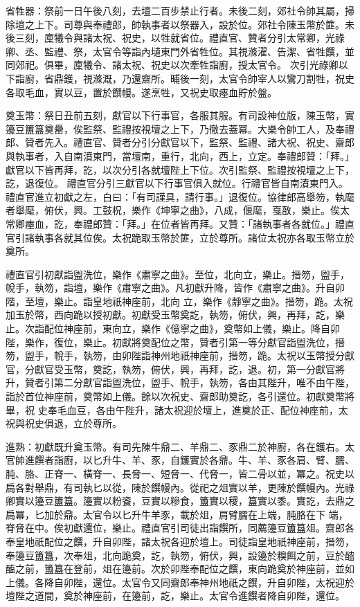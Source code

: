 \begin{pinyinscope}
 省牲器：祭前一日午後八刻，去壇二百步禁止行者。未後二刻，郊社令帥其屬，掃除壇之上下。司尊與奉禮郎，帥執事者以祭器入，設於位。郊社令陳玉幣於篚。未後三刻，廩犧令與諸太祝、祝史，以牲就省位。禮直官、贊者分引太常卿，光祿卿、丞、監禮、祭，太官令等詣內壝東門外省牲位。其視滌濯、告潔、省牲饌，並同郊祀。俱畢，廩犧令、諸太祝、祝史以次牽牲詣廚，授太官令。
 次引光祿卿以下詣廚，省鼎鑊，視滌溉，乃還齋所。晡後一刻，太官令帥宰人以鸞刀割牲，祝史各取毛血，實以豆，置於饌幔。遂烹牲，又祝史取瘞血貯於盤。



 奠玉幣：祭日丑前五刻，獻官以下行事官，各服其服。有司設神位版，陳玉幣，實籩豆簠簋奠罍，俟監祭、監禮按視壇之上下，乃徹去蓋冪。大樂令帥工人，及奉禮郎、贊者先入。禮直官、贊者分引分獻官以下，監祭、監禮、諸大祝、祝史、齋郎與執事者，入自南濆東門，當壇南，重行，北向，西上，立定。奉禮郎贊：「拜。」獻官以下皆再拜，訖，以次分引各就壇陛上下位。次引監祭、監禮按視壇之上下，訖，退復位。
 禮直官分引三獻官以下行事官俱入就位。行禮官皆自南濆東門入。禮直官進立初獻之左，白曰：「有司謹具，請行事。」退復位。協律郎高舉笏，執麾者舉麾，俯伏，興。工鼓柷，樂作《坤寧之曲》，八成，偃麾，戛敔，樂止。俟太常卿瘞血，訖，奉禮郎贊：「拜。」在位者皆再拜。又贊：「諸執事者各就位。」禮直官引諸執事各就其位俟。太祝跪取玉幣於篚，立於尊所。諸位太祝亦各取玉幣立於奠所。



 禮直官引初獻詣盥洗位，樂作《肅寧之曲》。至位，北向立，樂止。搢笏，盥手，帨手，執笏，詣壇，樂作《肅寧之曲》。凡初獻升降，皆作《肅寧之曲》。升自卯階，至壇，樂止。詣皇地祇神座前，北向
 立，樂作《靜寧之曲》。搢笏，跪。太祝加玉於幣，西向跪以授初獻。初獻受玉幣奠訖，執笏，俯伏，興，再拜，訖，樂止。次詣配位神座前，東向立，樂作《億寧之曲》，奠幣如上儀，樂止。降自卯陛，樂作，復位，樂止。初獻將奠配位之幣，贊者引第一等分獻官詣盥洗位，搢笏，盥手，帨手，執笏，由卯陛詣神州地祇神座前，搢笏，跪。太祝以玉幣授分獻官，分獻官受玉幣，奠訖，執笏，俯伏，興，再拜，訖，退。初，第一分獻官將升，贊者引第二分獻官詣盥洗位，盥手、帨手，執笏，各由其陛升，唯不由午陛，詣於首位神座前，奠幣如上儀。餘以次祝史、齋郎助奠訖，各引還位。初獻奠幣將畢，祝
 史奉毛血豆，各由午陛升，諸太祝迎於壇上，進奠於正、配位神座前，太祝與祝史俱退，立於尊所。



 進熟：初獻既升奠玉幣。有司先陳牛鼎二、羊鼎二、豕鼎二於神廚，各在鑊右。太官帥進饌者詣廚，以匕升牛、羊、豕，自鑊實於各鼎。牛、羊、豕各肩、臂、臑、肫、胳、正脊一、橫脊一、長脅一、短脅一、代脅一，皆二骨以並，冪之。祝史以扃各對舉鼎，有司執匕以從，陳於饌幔內。從祀之俎實以羊，更陳於饌幔內。光祿卿實以籩豆簠簋。籩實以粉餈，豆實以糝食，簠實以稷，簋實以黍。實訖，去鼎之扃冪，匕加於鼎。太官令以匕升牛羊豕，載於俎，肩臂臑在上端，肫胳在下
 端，脊脅在中。俟初獻還位，樂止。禮直官引司徒出詣饌所，同薦籩豆簠簋俎。齋郎各奉皇地祇配位之饌，升自卯陛，諸太祝各迎於壇上。司徒詣皇地祇神座前，搢笏，奉籩豆簠簋，次奉俎，北向跪奠，訖，執笏，俯伏，興，設籩於糗餌之前，豆於醓醢之前，簠簋在登前，俎在籩前。次於卯陛奉配位之饌，東向跪奠於神座前，並如上儀。各降自卯陛，還位。太官令又同齋郎奉神州地祇之饌，升自卯陛，太祝迎於壇陛之道間，奠於神座前，在籩前，訖，樂止。太官令進饌者降自卯陛，還位。




\end{pinyinscope}
